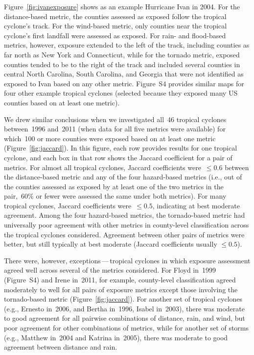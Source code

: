 Figure~\ref{fig:ivanexposure} shows as an example Hurricane Ivan in 2004.
For the distance-based metric, the counties assessed as exposed follow the
tropical cyclone's track. For the wind-based metric,
only counties near the tropical cyclone's first landfall were assessed as
exposed. For rain- and flood-based metrics, however, exposure extended to the
left of the track, including counties as far north as New York and Connecticut,
while for the tornado metric, exposed counties tended to be to the right of the
track and included several counties in central North Carolina, South Carolina,
and Georgia that were not identified as exposed to Ivan based on any other
metric. Figure~S4 provides similar maps for four other example tropical
cyclones (selected because they exposed many \ac{US}  counties based on at
least one metric).

We drew similar conclusions when we investigated all~46 tropical cyclones
between~1996 and~2011 (when data for all five metrics were
available) for which~100 or more counties were exposed based on at least one
metric (Figure~\ref{fig:jaccard}). In this figure, each row provides results
for one tropical cyclone, and each box in that row shows the Jaccard
coefficient for a pair of metrics.  For almost all tropical cyclones, Jaccard
coefficients were~$\le0.6$ between the distance-based metric and any of the
four hazard-based metrics (i.e., out of the counties assessed as exposed by at
least one of the two metrics in the pair,~60\si{\percent} or fewer were
assessed the same under both metrics). For many tropical cyclones, Jaccard
coefficients were~$\le0.5$, indicating at best moderate agreement.  Among the
four hazard-based metrics, the tornado-based metric had universally poor
agreement with other metrics in county-level classification across the tropical
cyclones considered.  Agreement between other pairs of metrics were better, but
still typically at best moderate (Jaccard coefficients usually $\le0.5$).

There were, however, exceptions\,---\,tropical cyclones in which exposure
assessment agreed well across several of the metrics considered.  For Floyd
in~1999 (Figure~S4) and Irene in~2011, for example, county-level classification
agreed moderately to well for all pairs of exposure metrics except those
involving the tornado-based metric (Figure~\ref{fig:jaccard}). For another set
of tropical cyclones (e.g., Ernesto in~2006, and Bertha in~1996, Isabel
in~2003), there was moderate to good agreement for all pairwise combinations of
distance, rain, and wind, but poor agreement for other combinations of metrics,
while for another set of storms (e.g., Matthew in~2004 and Katrina in~2005),
there was moderate to good agreement between distance and rain.  



